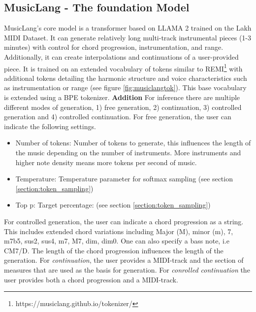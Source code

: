 \subsection{MusicLang - The foundation Model}
MusicLang's core model is a transformer based on LLAMA 2 trained on the Lakh MIDI Dataset\cite{Raffel_2016}. It can generate relatively long multi-track instrumental pieces (1-3 minutes) with control for chord progression, instrumentation, and range. Additionally, it can create interpolations and continuations of a user-provided piece. It is trained on an extended vocabulary of tokens similar to REMI\footnote{https://musiclang.github.io/tokenizer/} with additional tokens detailing the harmonic structure and voice characteristics such as instrumentation or range (see figure \ref{fig:musiclangtok}). This base vocabulary is extended using a BPE tokenizer. 
\textbf{Addition} For inference there are multiple different modes of generation, 1) free generation, 2) continuation, 3) controlled generation and 4) controlled continuation. For free generation, the user can indicate the following settings.
\begin{itemize}
    \item Number of tokens: Number of tokens to generate, this influences the length of the music depending on the number of instruments. More instruments and higher note density means more tokens per second of music.
    \item Temperature: Temperature parameter for softmax sampling (see section \ref{section:token_sampling})
    \item  Top p: Target percentage: (see section \ref{section:token_sampling}) 
\end{itemize}
For controlled generation, the user can indicate a chord progression as a string. This includes extended chord variations including Major (M), minor (m), 7, m7b5, sus2, sus4, m7, M7, dim, dim0. One can also specify a bass note, i.e CM7/D. The length of the chord progression influences the length of the generation.
For \textit{continuation}, the user provides a MIDI-track and the section of measures that are used as the basis for generation.
For \textit{conrolled continuation} the user provides both a chord progression and a MIDI-track. 

